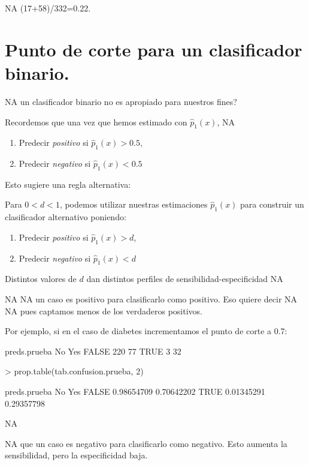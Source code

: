 \documentclass[nohyper]{tufte-handout}
\begin{document}
NA
(17+58)/332=0.22.


\section{Punto de corte para un clasificador binario.}

NA
un clasificador binario no es apropiado para nuestros fines?

Recordemos que una vez que hemos estimado con $\hat{p}_1 (x)$, 
NA

\begin{enumerate}
\item Predecir {\em positivo} si $\hat{p}_1 (x)>0.5$,
\item Predecir {\em negativo} si $\hat{p}_1 (x)<0.5$
\end{enumerate}

Esto sugiere una regla alternativa:

\begin{shaded}
Para $0<d<1$, podemos utilizar nuestras estimaciones
$\hat{p}_1 (x)$ para construir un clasificador alternativo poniendo:
\begin{enumerate}
\item Predecir {\em positivo} si $\hat{p}_1 (x)>d$,
\item Predecir {\em negativo} si $\hat{p}_1 (x)<d$
\end{enumerate}
\end{shaded}

Distintos valores de $d$ dan distintos perfiles de sensibilidad-especificidad
NA

\begin{itemize}
NA
NA
un caso es positivo para clasificarlo como positivo. Eso quiere decir
NA
NA
pues captamos menos de los verdaderos positivos.

Por ejemplo, si en el caso de diabetes incrementamos el punto
de corte a 0.7:
\begin{Schunk}
\begin{Soutput}
preds.prueba  No Yes
       FALSE 220  77
       TRUE    3  32
\end{Soutput}
\begin{Sinput}
> prop.table(tab.confusion.prueba, 2)
\end{Sinput}
\begin{Soutput}
preds.prueba         No        Yes
       FALSE 0.98654709 0.70642202
       TRUE  0.01345291 0.29357798
\end{Soutput}
\end{Schunk}
NA

NA
que un caso es negativo para clasificarlo como negativo. Esto
aumenta la sensibilidad, pero la especificidad baja.
\end{itemize}
\end{document}
